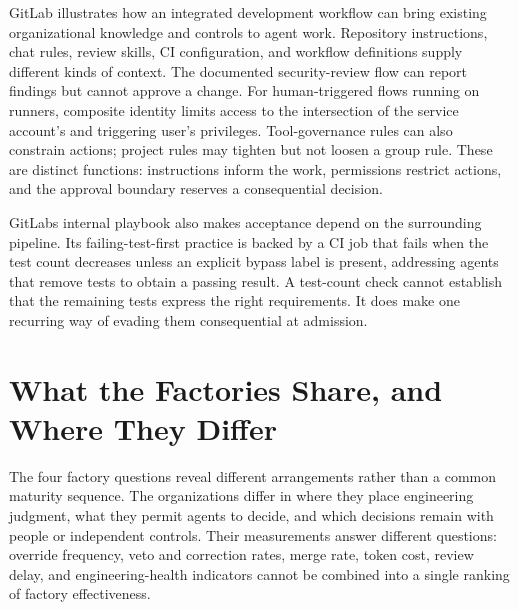 GitLab illustrates how an integrated development workflow can bring existing organizational knowledge and controls to agent work. Repository instructions, chat rules, review skills, CI configuration, and workflow definitions supply different kinds of context\citep{gitlab2026customize}. The documented security-review flow can report findings but cannot approve a change\citep{gitlab2026securityreview}. For human-triggered flows running on runners, composite identity limits access to the intersection of the service account's and triggering user's privileges\citep{gitlab2026identity}. Tool-governance rules can also constrain actions; project rules may tighten but not loosen a group rule\citep{gitlab2026toolgovernance}. These are distinct functions: instructions inform the work, permissions restrict actions, and the approval boundary reserves a consequential decision.

GitLab\textquotesingle s internal playbook also makes acceptance depend on the surrounding pipeline. Its failing-test-first practice is backed by a CI job that fails when the test count decreases unless an explicit bypass label is present, addressing agents that remove tests to obtain a passing result\citep{gitlab2026playbook}. A test-count check cannot establish that the remaining tests express the right requirements. It does make one recurring way of evading them consequential at admission.

\section{What the Factories Share, and Where They Differ}\label{heading:what-the-factories-share-and-where-they-differ}


The four factory questions reveal different arrangements rather than a common maturity sequence. The organizations differ in where they place engineering judgment, what they permit agents to decide, and which decisions remain with people or independent controls. Their measurements answer different questions: override frequency, veto and correction rates, merge rate, token cost, review delay, and engineering-health indicators cannot be combined into a single ranking of factory effectiveness.

